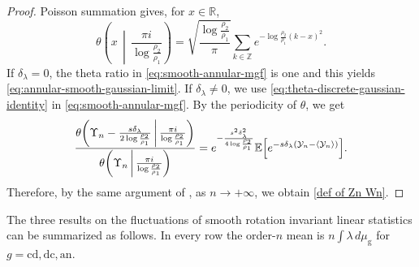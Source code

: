 \documentclass[a4paper]{article}
\newcommand{\R}{\mathbb{R}}
\numberwithin{equation}{section}
\begin{document}
\begin{proof}
Poisson summation gives, for $x\in \R$,
\begin{equation}
\label{eq:theta-discrete-gaussian-identity}
\theta\!\left(x\,\middle|\,\frac{\pi i}{\log\frac{\rho_2}{\rho_1}}\right)
=\sqrt{\frac{\log\frac{\rho_2}{\rho_1}}{\pi}}
 \sum_{k\in\mathbb Z}e^{-\log\frac{\rho_2}{\rho_1}(k-x)^2}.
\end{equation}
If $\delta_\lambda=0$, the theta ratio in
\eqref{eq:smooth-annular-mgf} is one and this yields
\eqref{eq:annular-smooth-gaussian-limit}. 
If $\delta_\lambda\ne0$, we use
\eqref{eq:theta-discrete-gaussian-identity} in
\eqref{eq:smooth-annular-mgf}. 
By the periodicity of $\theta$, we get 
\[
\frac{\theta\!\left(\Upsilon_n-\frac{s\delta_{\lambda}}{2\log\frac{\rho_2}{\rho_1}}\,\middle|\,\frac{\pi i}{\log\frac{\rho_2}{\rho_1}}\right)}
{\theta\!\left(\Upsilon_n\,\middle|\,\frac{\pi i}{\log\frac{\rho_2}{\rho_1}}\right)}
=
e^{-\frac{s^2\delta_{\lambda}^2}{4\log\frac{\rho_2}{\rho_1}}}\mathbb{E}\Bigl[e^{-s\delta_{\lambda}(\mathcal{Y}_n-\langle\mathcal{Y}_n\rangle)}\Bigr].
\]
Therefore, by the same argument of \cite[Proof of Corollary 1.7]{ACCL2}, as $n\to+\infty$, we obtain \eqref{def of Zn Wn}. 

\end{proof}


The three results on the fluctuations of smooth rotation invariant linear statistics can be summarized as follows.  In every
row the order-$n$ mean is $n\int\lambda\,d\mu_{\mathrm g}$ for $g=\mathrm{cd,dc,an}$.
\end{document}
